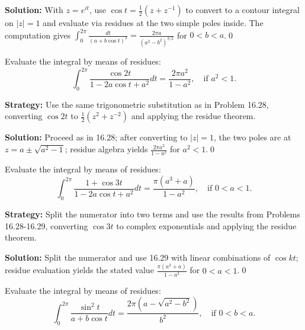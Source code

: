 \bigskip\noindent\textbf{Solution:}
With $z=e^{it}$, use $\cos t=\tfrac12(z+z^{-1})$ to convert to a contour integral on $|z|=1$ and evaluate via residues at the two simple poles inside. The computation gives $\int_0^{2\pi}\frac{dt}{(a+b\cos t)^2}=\frac{2\pi a}{(a^2-b^2)^{3/2}}$ for $0<b<a$.\qed


\begin{problembox}
\begin{problemstatement}
Evaluate the integral by means of residues:
\[ \int_0^{2\pi} \frac{\cos 2t}{1 - 2a \cos t + a^2} dt = \frac{2\pi a^2}{1 - a^2}, \quad \text{if } a^2 < 1. \]
\end{problemstatement}
\end{problembox}

\noindent\textbf{Strategy:} Use the same trigonometric substitution as in Problem 16.28, converting \( \cos 2t \) to \( \frac{1}{2}(z^2 + z^{-2}) \) and applying the residue theorem.

\bigskip\noindent\textbf{Solution:}
Proceed as in 16.28; after converting to $|z|=1$, the two poles are at $z=a\pm\sqrt{a^2-1}$; residue algebra yields $\frac{2\pi a^2}{1-a^2}$ for $a^2<1$.\qed


\begin{problembox}
\begin{problemstatement}
Evaluate the integral by means of residues:
\[ \int_0^{2\pi} \frac{1 + \cos 3t}{1 - 2a \cos t + a^2} dt = \frac{\pi (a^3 + a)}{1 - a^2}, \quad \text{if } 0 < a < 1. \]
\end{problemstatement}
\end{problembox}

\noindent\textbf{Strategy:} Split the numerator into two terms and use the results from Problems 16.28-16.29, converting \( \cos 3t \) to complex exponentials and applying the residue theorem.

\bigskip\noindent\textbf{Solution:}
Split the numerator and use 16.29 with linear combinations of $\cos kt$; residue evaluation yields the stated value $\frac{\pi(a^3+a)}{1-a^2}$ for $0<a<1$.\qed


\begin{problembox}
\begin{problemstatement}
Evaluate the integral by means of residues:
\[ \int_0^{2\pi} \frac{\sin^2 t}{a + b \cos t} dt = \frac{2\pi (a - \sqrt{a^2 - b^2})}{b^2}, \quad \text{if } 0 < b < a. \]
\end{problemstatement}
\end{problembox}

